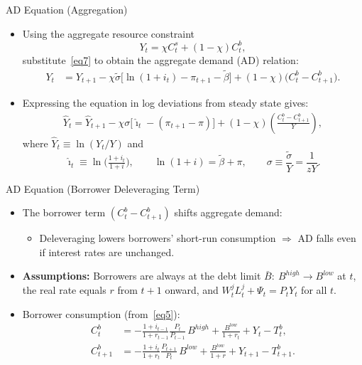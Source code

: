 \documentclass[11pt,aspectratio=169]{beamer}
\begin{document}
\begin{frame}{AD Equation (Aggregation)}
\small
\begin{itemize}
  \item Using the aggregate resource constraint
  \[
    Y_t=\chi C_t^s+(1-\chi)C_t^b,
  \]
  substitute~\eqref{eq7} to obtain the aggregate demand (AD) relation:
  \begin{align*}
    Y_t
    &= Y_{t+1}
    -\chi\tilde{\sigma}\Big[\ln(1+i_t)-\pi_{t+1}-\tilde{\beta}\Big]
    +(1-\chi)\big(C_t^b-C_{t+1}^b\big).
  \end{align*}
  \vspace{0.2em}
  \item Expressing the equation in log deviations from steady state gives:
  \begin{align}
    \hat{Y}_t
    = \hat{Y}_{t+1}
    - \chi\sigma\Big[\hat{\imath}_t-(\pi_{t+1}-\pi)\Big]
    + (1-\chi)\left(\frac{C_t^b-C_{t+1}^b}{Y}\right),
    \label{eq8}
  \end{align}
  where $\hat{Y}_t\equiv \ln(Y_t/Y)$ and
  \[
    \hat{\imath}_t\equiv \ln\!\Big(\tfrac{1+i_t}{1+i}\Big),
    \qquad \ln(1+i)=\tilde{\beta}+\pi,
    \qquad \sigma\equiv \frac{\tilde{\sigma}}{Y}=\frac{1}{zY}.
  \]
\end{itemize}
\end{frame}

\begin{frame}{AD Equation (Borrower Deleveraging Term)}
\small
\begin{itemize}
  \item The borrower term $(C_t^b-C_{t+1}^b)$ shifts aggregate demand:
  \begin{itemize}
    \item Deleveraging lowers borrowers' short-run consumption $\Rightarrow$ AD falls even if interest rates are unchanged.
  \end{itemize}

  \vspace{0.35em}
  \item \textbf{Assumptions:} Borrowers are always at the debt limit
  $\bar B:\ B^{high}\to B^{low}$ at $t$, the real rate equals $r$ from $t+1$ onward,
  and $W_t^jL_t^j+\Psi_t=P_tY_t$ for all $t$.

  \vspace{0.35em}
  \item Borrower consumption (from~\ref{eq5}):
\[
\begin{aligned}
C_t^b
&= -\frac{1+i_{t-1}}{1+r_{t-1}}\frac{P_t}{P_{t-1}}\,B^{high}
  +\frac{B^{low}}{1+r_t}
  +Y_t-T_t^b,\\[0.3em]
C_{t+1}^b
&= -\frac{1+i_t}{1+r_t}\frac{P_{t+1}}{P_t}\,B^{low}
  +\frac{B^{low}}{1+r}
  +Y_{t+1}-T_{t+1}^b.
\end{aligned}
\]
\end{itemize}
\end{frame}
\end{document}
